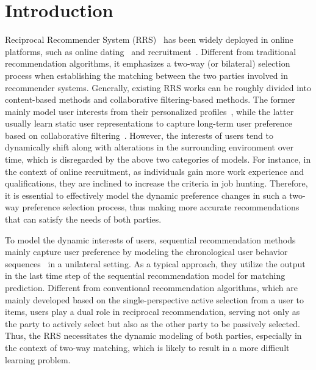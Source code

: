 \section{Introduction}

Reciprocal Recommender System (RRS)~\cite{pizzato2010recon} has been widely deployed in online platforms, such as online dating~\cite{pizzato2010recon,xia2015reciprocal,neve2019latent} and recruitment~\cite{le2019towards,jiang2020learning,yang2022modeling}.
Different from traditional recommendation algorithms, it emphasizes a two-way (or bilateral) selection process when establishing the matching between the two parties involved in recommender systems. 
Generally, existing RRS works can be roughly divided into content-based methods and collaborative filtering-based methods. 
The former mainly model user interests from their
personalized profiles~\cite{pizzato2010recon,luo2020rrcn,yildirim2021bideepfm}, while the latter usually learn static user representations to capture long-term user preference based on collaborative filtering~\cite{xia2015reciprocal,neve2019latent,luo2020motif}. 
However, the interests of users tend to dynamically shift along with alterations in the surrounding environment over time, which is disregarded by the above two categories of models.  
For instance, in the context of online recruitment, as individuals gain more work experience and qualifications, they are inclined to increase the criteria in job hunting. 
Therefore, it is essential to effectively model the dynamic preference changes in such a two-way preference selection process, thus making more accurate recommendations that can satisfy the needs of both parties.

To model the dynamic interests of users, sequential recommendation methods mainly capture user preference by modeling the   chronological user behavior sequences~\cite{kang2018self,sun2019bert4rec} in a unilateral setting. 
As a typical approach, they utilize the output in the last time step of the sequential recommendation model for matching prediction. 
Different from conventional recommendation algorithms, which are mainly developed based on the single-perspective active selection from a user to items, 
users play  a dual role in reciprocal recommendation, serving not only as the party to actively select but also as the other party to be passively selected.  
Thus, the RRS necessitates the dynamic modeling of both parties, especially in the context of two-way matching, which is likely to result in a more difficult learning problem. 



